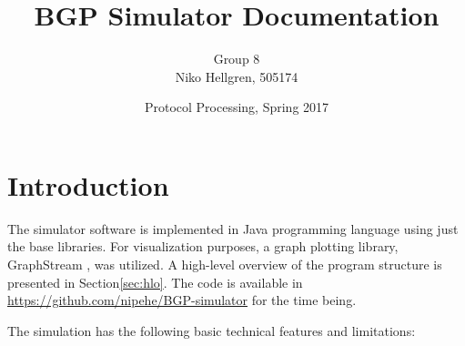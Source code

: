 \documentclass[11pt,a4paper,titlepage]{report}
\author{Group 8\\Niko Hellgren, 505174}
\title{BGP Simulator Documentation}
\date{Protocol Processing, Spring 2017}
\begin{document}
\maketitle
\tableofcontents
\pagebreak

\section{Introduction}\label{sec:intro}
The simulator software is implemented in Java programming language using just the base libraries. For visualization purposes, a graph plotting library, GraphStream \cite{graphstreamteam2017}, was utilized. A high-level overview of the program structure is presented in Section\ref{sec:hlo}. The code is available in \url{https://github.com/nipehe/BGP-simulator} for the time being.

The simulation has the following basic technical features and limitations:
\end{document}
